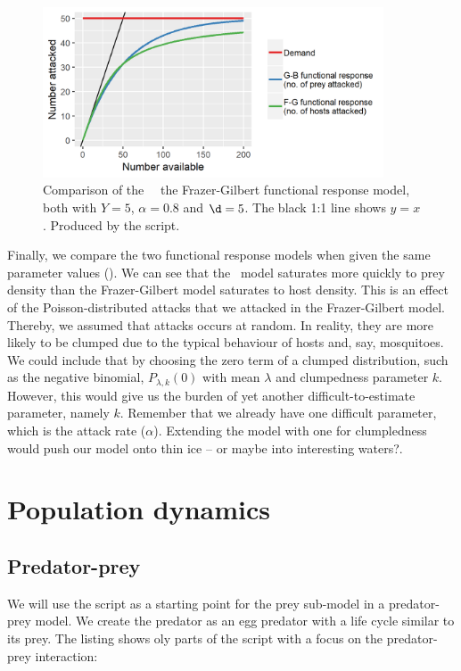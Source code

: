 \begin{figure} [ht]
\centering
\includegraphics[width=0.9\textwidth]{graphics/func-resp-gb-fg}
\caption{Comparison of the \GB\ \vs\ the Frazer-Gilbert functional response model, both with $Y=5$, $\alpha=0.8$ and $\d=5$. The black 1:1 line shows $y=x$. Produced by the  script.}
\label{fig:func-resp-gb-fg}
\end{figure}

Finally, we compare the two functional response models when given the same parameter values (). We can see that the \GB\ model saturates more quickly to prey density than the Frazer-Gilbert model saturates to host density. This is an effect of the Poisson-distributed attacks that we attacked in the Frazer-Gilbert model. Thereby, we assumed that attacks occurs at random. In reality, they are more likely to be clumped due to the typical behaviour of hosts and, say, mosquitoes. We could include that by choosing the zero term of a clumped distribution, such as the negative binomial, $P_{\lambda,k}(0)$ with mean $\lambda$ and clumpedness parameter $k$. However, this would give us the burden of yet another difficult-to-estimate parameter, namely $k$. Remember that we already have one difficult parameter, which is the attack rate ($\alpha$). Extending the model with one for clumpledness would push our model onto thin ice -- or maybe into interesting waters?.

\FloatBarrier
\section{Population dynamics}
\subsection{Predator-prey}

We will use the  script as a starting point for the prey sub-model in a predator-prey model. We create the predator as an egg predator with a life cycle  similar to its prey. The listing shows oly parts of the   script with a focus on the predator-prey interaction:

